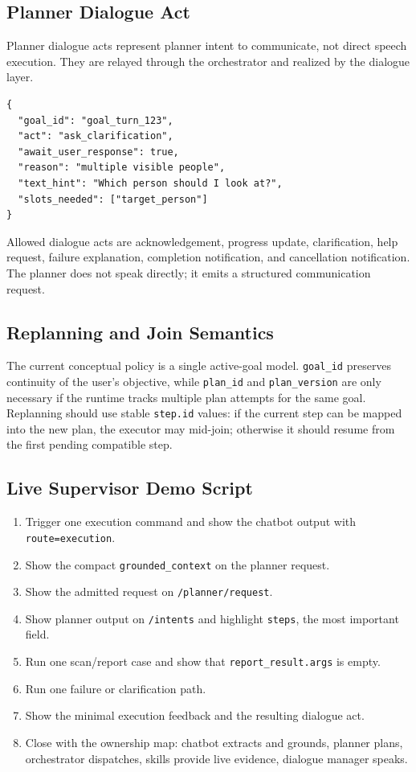 \documentclass[12pt,a4paper]{article}
\newcommand{\code}[1]{\texttt{#1}}
\begin{document}
\subsection{Planner Dialogue Act}

Planner dialogue acts represent planner intent to communicate, not direct speech execution. They are relayed through the orchestrator and realized by the dialogue layer.

\begin{lstlisting}
{
  "goal_id": "goal_turn_123",
  "act": "ask_clarification",
  "await_user_response": true,
  "reason": "multiple visible people",
  "text_hint": "Which person should I look at?",
  "slots_needed": ["target_person"]
}
\end{lstlisting}

Allowed dialogue acts are acknowledgement, progress update, clarification, help request, failure explanation, completion notification, and cancellation notification. The planner does not speak directly; it emits a structured communication request.

\subsection{Replanning and Join Semantics}

The current conceptual policy is a single active-goal model. \code{goal\_id} preserves continuity of the user's objective, while \code{plan\_id} and \code{plan\_version} are only necessary if the runtime tracks multiple plan attempts for the same goal. Replanning should use stable \code{step.id} values: if the current step can be mapped into the new plan, the executor may mid-join; otherwise it should resume from the first pending compatible step.

\subsection{Live Supervisor Demo Script}

\begin{enumerate}
\item Trigger one execution command and show the chatbot output with \code{route=execution}.
\item Show the compact \code{grounded\_context} on the planner request.
\item Show the admitted request on \code{/planner/request}.
\item Show planner output on \code{/intents} and highlight \code{steps}, the most important field.
\item Run one scan/report case and show that \code{report\_result.args} is empty.
\item Run one failure or clarification path.
\item Show the minimal execution feedback and the resulting dialogue act.
\item Close with the ownership map: chatbot extracts and grounds, planner plans, orchestrator dispatches, skills provide live evidence, dialogue manager speaks.
\end{enumerate}
\end{document}
